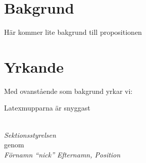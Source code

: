 \documentclass{dtek}
\begin{document}
\maketitle

\section*{Bakgrund}

Här kommer lite bakgrund till propositionen

\section*{Yrkande}
Med ovanstående som bakgrund yrkar vi:

\begin{attsatser}
  \att Latexmupparna är snyggast
\end{attsatser}

\ \\
\textit{Sektionsstyrelsen}\\
genom\\
\textit{Förnamn \enquote{nick} Efternamn, Position}
\end{document}
